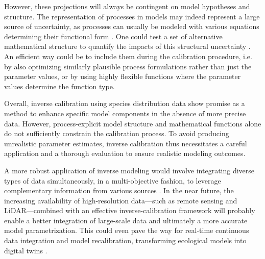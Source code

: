 \documentclass[letterpaper,8pt]{extarticle}  %
\begin{document}
\begin{doublespacing}
\begin{linenumbers}
However, these projections will always be contingent on model hypotheses and structure. The representation of processes in models may indeed represent a large source of uncertainty, as processes can usually be modeled with various equations determining their functional form \citep{Keenan2011}. One could test a set of alternative mathematical structure to quantify the impacts of this structural uncertainty \citep{Huber2020}. An efficient way could be to include them during the calibration procedure, i.e. by also optimizing similarly plausible process formulations rather than just the parameter values, or by using highly flexible functions where the parameter values determine the function type.


Overall, inverse calibration using species distribution data show promise as a method to enhance specific model components in the absence of more precise data. However, process-explicit model structure and mathematical functions alone do not sufficiently constrain the calibration process. To avoid producing unrealistic parameter estimates, inverse calibration thus necessitates a careful application and a thorough evaluation to ensure realistic modeling outcomes. 

A more robust application of inverse modeling would involve integrating diverse types of data simultaneously, in a multi-objective fashion, to leverage complementary information from various sources \citep{Cameron2022}. In the near future, the increasing availability of high-resolution data---such as remote sensing and LiDAR---combined with an effective inverse-calibration framework will probably enable a better integration of large-scale data and ultimately a more accurate model parametrization. This could even pave the way for real-time continuous data integration and model recalibration, transforming ecological models into digital twins \citep{Koning2023}.





\end{linenumbers}
\end{doublespacing}
\end{document}
